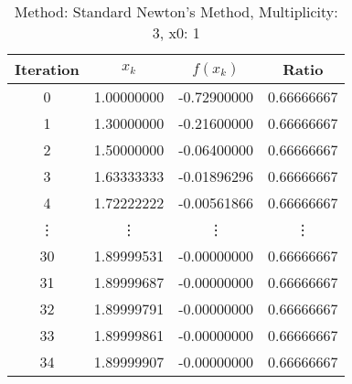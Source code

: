 \begin{table}
\centering
\caption{Method: Standard Newton's Method, Multiplicity: 3, x0: 1}
\label{tab:table_Standard_Newton's_Method_3_1}
\begin{tabular}{c c c c}
\toprule
Iteration &      $x_k$ &    $f(x_k)$ &      Ratio \\
\midrule
        0 & 1.00000000 & -0.72900000 & 0.66666667 \\
        1 & 1.30000000 & -0.21600000 & 0.66666667 \\
        2 & 1.50000000 & -0.06400000 & 0.66666667 \\
        3 & 1.63333333 & -0.01896296 & 0.66666667 \\
        4 & 1.72222222 & -0.00561866 & 0.66666667 \\
   \vdots &     \vdots &      \vdots &     \vdots \\
       30 & 1.89999531 & -0.00000000 & 0.66666667 \\
       31 & 1.89999687 & -0.00000000 & 0.66666667 \\
       32 & 1.89999791 & -0.00000000 & 0.66666667 \\
       33 & 1.89999861 & -0.00000000 & 0.66666667 \\
       34 & 1.89999907 & -0.00000000 & 0.66666667 \\
\bottomrule
\end{tabular}
\end{table}
